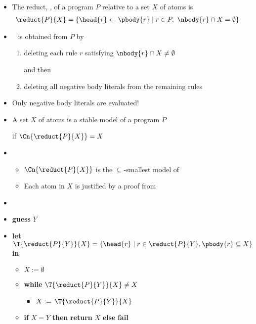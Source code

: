 \begin{frame}{}

  \begin{itemize}
  \item <2-11> The \alert{reduct}, , of a program $P$ relative to
    a set $X$ of atoms is
    \begin{align*}
      \reduct{P}{X} &= \{\head{r}\leftarrow\pbody{r} \mid r\in P,\ \nbody{r}\cap X=\emptyset\}
    \end{align*}

  \item<only@3-4>  \  is obtained from $P$ by
    \begin{enumerate}\normalsize
    \item deleting each rule $r$ satisfying $\nbody{r}\cap X\neq\emptyset$

      and then

    \item deleting all negative body literals from the remaining rules
    \end{enumerate}
  \item<only@4>[] Only negative body literals are evaluated!

  \item <only@6-11> A set $X$ of atoms is a \alert{stable model} of a program $P$

    if $\Cn{\reduct{P}{X}}=X$

    \smallskip

  \item<only@8> 
    \begin{itemize}\normalsize
    \item $\Cn{\reduct{P}{X}}$ is the $\subseteq$-smallest model of 
      \smallskip
    \item Each atom in $X$ is justified by a proof from 
    \end{itemize}

  \item<only@9-10> 

  \item<only@10> []\small \textbf{guess} $Y$
  \item<only@10> []\small \textbf{let} $\T{\reduct{P}{Y}}{X}=\{\head{r}\mid r\in \reduct{P}{Y}, \pbody{r}\subseteq X\}$ \textbf{in}
    \begin{itemize}
    \item []$X := \emptyset$
      \smallskip
    \item []\textbf{while} {$\T{\reduct{P}{Y}}{X}\neq X$}
      \begin{itemize}\small
      \item[] $X := {\,\T{\reduct{P}{Y}}{X}}$
      \end{itemize}
    \item[]\small \textbf{if} $X=Y$ \textbf{then} \textbf{return} $X$ \textbf{else} \textbf{fail}
    \end{itemize}


\end{itemize}
\end{frame}

